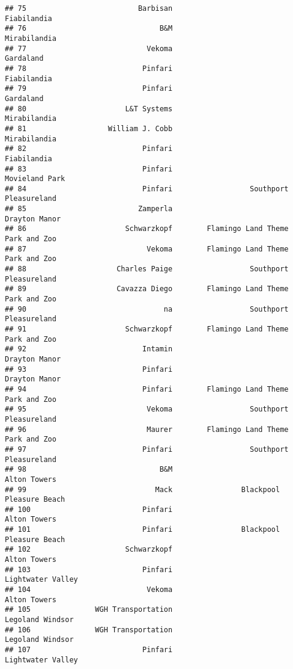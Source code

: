 \documentclass[
]{article}
\begin{document}
\begin{verbatim}
## 75                          Barbisan                             Fiabilandia
## 76                               B&M                            Mirabilandia
## 77                            Vekoma                               Gardaland
## 78                           Pinfari                             Fiabilandia
## 79                           Pinfari                               Gardaland
## 80                       L&T Systems                            Mirabilandia
## 81                   William J. Cobb                            Mirabilandia
## 82                           Pinfari                             Fiabilandia
## 83                           Pinfari                          Movieland Park
## 84                           Pinfari                  Southport Pleasureland
## 85                          Zamperla                           Drayton Manor
## 86                       Schwarzkopf        Flamingo Land Theme Park and Zoo
## 87                            Vekoma        Flamingo Land Theme Park and Zoo
## 88                     Charles Paige                  Southport Pleasureland
## 89                     Cavazza Diego        Flamingo Land Theme Park and Zoo
## 90                                na                  Southport Pleasureland
## 91                       Schwarzkopf        Flamingo Land Theme Park and Zoo
## 92                           Intamin                           Drayton Manor
## 93                           Pinfari                           Drayton Manor
## 94                           Pinfari        Flamingo Land Theme Park and Zoo
## 95                            Vekoma                  Southport Pleasureland
## 96                            Maurer        Flamingo Land Theme Park and Zoo
## 97                           Pinfari                  Southport Pleasureland
## 98                               B&M                            Alton Towers
## 99                              Mack                Blackpool Pleasure Beach
## 100                          Pinfari                            Alton Towers
## 101                          Pinfari                Blackpool Pleasure Beach
## 102                      Schwarzkopf                            Alton Towers
## 103                          Pinfari                       Lightwater Valley
## 104                           Vekoma                            Alton Towers
## 105               WGH Transportation                        Legoland Windsor
## 106               WGH Transportation                        Legoland Windsor
## 107                          Pinfari                       Lightwater Valley

\end{verbatim}
\end{document}
